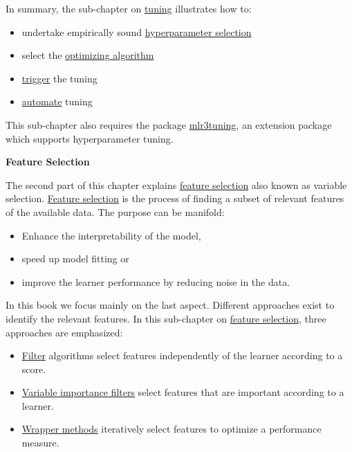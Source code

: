 \documentclass[]{scrbook}
\providecommand{\tightlist}{%
  \setlength{\itemsep}{0pt}\setlength{\parskip}{0pt}}
\begin{document}
In summary, the sub-chapter on \protect\hyperlink{tuning}{tuning} illustrates how to:

\begin{itemize}
\tightlist
\item
  undertake empirically sound \protect\hyperlink{tuning}{hyperparameter selection}
\item
  select the \protect\hyperlink{tuning-optimization}{optimizing algorithm}
\item
  \protect\hyperlink{tuning-triggering}{trigger} the tuning
\item
  \protect\hyperlink{autotuner}{automate} tuning
\end{itemize}

This sub-chapter also requires the package \href{https://mlr3tuning.mlr-org.com}{mlr3tuning}, an extension package which supports hyperparameter tuning.

\textbf{Feature Selection}

The second part of this chapter explains \protect\hyperlink{fs}{feature selection} also known as variable selection.
\protect\hyperlink{fs}{Feature selection} is the process of finding a subset of relevant features of the available data.
The purpose can be manifold:

\begin{itemize}
\tightlist
\item
  Enhance the interpretability of the model,
\item
  speed up model fitting or
\item
  improve the learner performance by reducing noise in the data.
\end{itemize}

In this book we focus mainly on the last aspect.
Different approaches exist to identify the relevant features.
In this sub-chapter on \protect\hyperlink{fs}{feature selection}, three approaches are emphasized:

\begin{itemize}
\tightlist
\item
  \protect\hyperlink{fs-filter}{Filter} algorithms select features independently of the learner according to a score.
\item
  \protect\hyperlink{fs-var-imp-filter}{Variable importance filters} select features that are important according to a learner.
\item
  \protect\hyperlink{fs-wrapper}{Wrapper methods} iteratively select features to optimize a performance measure.
\end{itemize}
\end{document}
